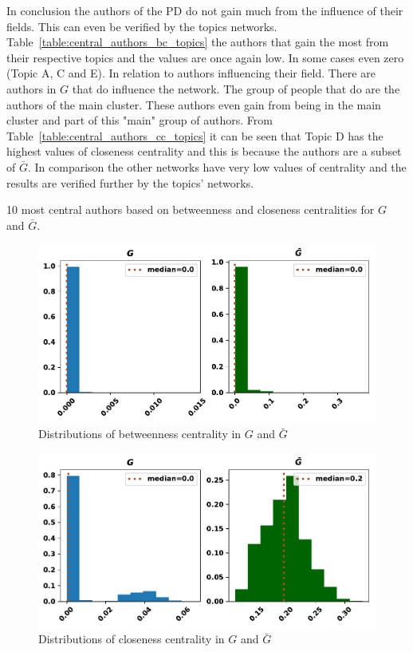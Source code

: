 \documentclass{article}
\theoremstyle{definition}
\begin{document}
In conclusion the authors of the PD do not gain much from the influence of their
fields. This can even be verified by the topics networks. Table~\ref{table:central_authors_bc_topics}
the authors that gain the most from their respective topics and the values are
once again low. In some cases even zero (Topic A, C and E).
In relation to authors influencing their field. There are authors in \(G\) that
do influence the network. The group of people that do are the authors of
the main cluster. These authors even gain from being in the main cluster and
part of this "main" group of authors. From Table~\ref{table:central_authors_cc_topics}
it can be seen that Topic D
has the highest values of closeness centrality and this is because the authors
are a subset of \(\bar{G}\). In comparison the other networks have very low
values of centrality and the results are verified further by the topics' networks.


\begin{table}[!hbtp]
    \begin{center}
    \resizebox{.9\textwidth}{!}{}
\end{center}
\caption{10 most central authors based on betweenness and closeness centralities
for \(G\) and \(\bar{G}\).}\label{table:central_authors}
\end{table}

\begin{figure}[!hbtp]
    \centering
    \includegraphics[width=.55\textwidth]{./assets/images/pd_betweeness_centralities.pdf}
    \caption{Distributions of betweenness centrality in \(G\) and \(\bar{G}\)}
    \label{fig:bc_distributions}
\end{figure}

\begin{figure}[!hbtp]
    \centering
    \includegraphics[width=.55\textwidth]{./assets/images/pd_closeness_centralities.pdf}
    \caption{Distributions of closeness centrality in \(G\) and \(\bar{G}\)}
    \label{fig:cc_distributions}
\end{figure}
\end{document}
